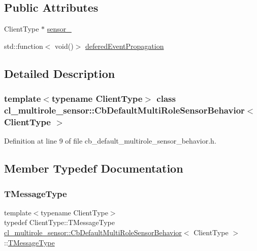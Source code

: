 \subsection*{Public Attributes}
\begin{DoxyCompactItemize}
\item 
Client\+Type $\ast$ \hyperlink{classcl__multirole__sensor_1_1CbDefaultMultiRoleSensorBehavior_a201893c3c859259eac3166405f3509cb}{sensor\+\_\+}
\item 
std\+::function$<$ void()$>$ \hyperlink{classcl__multirole__sensor_1_1CbDefaultMultiRoleSensorBehavior_a18f86fd2fd9c3575b62a2c58953b7d33}{defered\+Event\+Propagation}
\end{DoxyCompactItemize}


\subsection{Detailed Description}
\subsubsection*{template$<$typename Client\+Type$>$\newline
class cl\+\_\+multirole\+\_\+sensor\+::\+Cb\+Default\+Multi\+Role\+Sensor\+Behavior$<$ Client\+Type $>$}



Definition at line 9 of file cb\+\_\+default\+\_\+multirole\+\_\+sensor\+\_\+behavior.\+h.



\subsection{Member Typedef Documentation}
\mbox{\label{classcl__multirole__sensor_1_1CbDefaultMultiRoleSensorBehavior_aa23bc8c99de1eddad01d094bdab62aa4}} 
\subsubsection{\texorpdfstring{T\+Message\+Type}{TMessageType}}
{\footnotesize\ttfamily template$<$typename Client\+Type$>$ \\
typedef Client\+Type\+::\+T\+Message\+Type \hyperlink{classcl__multirole__sensor_1_1CbDefaultMultiRoleSensorBehavior}{cl\+\_\+multirole\+\_\+sensor\+::\+Cb\+Default\+Multi\+Role\+Sensor\+Behavior}$<$ Client\+Type $>$\+::\hyperlink{classcl__multirole__sensor_1_1CbDefaultMultiRoleSensorBehavior_aa23bc8c99de1eddad01d094bdab62aa4}{T\+Message\+Type}}



